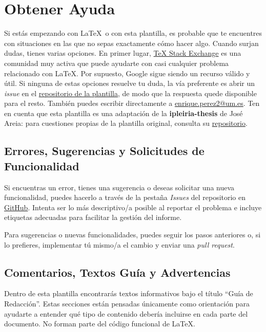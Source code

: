 {\section{Obtener Ayuda}

Si estás empezando con \LaTeX~o con esta plantilla, es probable que te encuentres con situaciones en las que no sepas exactamente cómo hacer algo. Cuando surjan dudas, tienes varias opciones. En primer lugar, \href{https://tex.stackexchange.com/}{TeX Stack Exchange} es una comunidad muy activa que puede ayudarte con casi cualquier problema relacionado con \LaTeX. Por supuesto, Google sigue siendo un recurso válido y útil. Si ninguna de estas opciones resuelve tu duda, la vía preferente es abrir un \textit{issue} en el \href{https://github.com/enriiquee/umu-thesis/issues}{repositorio de la plantilla}, de modo que la respuesta quede disponible para el resto. También puedes escribir directamente a \href{mailto:enrique.perez2@um.es}{enrique.perez2@um.es}. Ten en cuenta que esta plantilla es una adaptación de la \textbf{ipleiria-thesis} de José Areia: para cuestiones propias de la plantilla original, consulta su \href{https://github.com/joseareia/ipleiria-thesis}{repositorio}.

\subsection{Errores, Sugerencias y Solicitudes de Funcionalidad}

Si encuentras un error, tienes una sugerencia o deseas solicitar una nueva funcionalidad, puedes hacerlo a través de la pestaña \textit{Issues} del repositorio en \href{https://github.com/enriiquee/umu-thesis}{GitHub}. Intenta ser lo más descriptivo/a posible al reportar el problema e incluye etiquetas adecuadas para facilitar la gestión del informe.

Para sugerencias o nuevas funcionalidades, puedes seguir los pasos anteriores o, si lo prefieres, implementar tú mismo/a el cambio y enviar una \textit{pull request}. 

\subsection{Comentarios, Textos Guía y Advertencias}

Dentro de esta plantilla encontrarás textos informativos bajo el título ``Guía de Redacción''. Estas secciones están pensadas únicamente como orientación para ayudarte a entender qué tipo de contenido debería incluirse en cada parte del documento. No forman parte del código funcional de \LaTeX.

}
